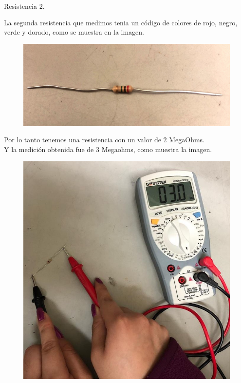 \documentclass[12pt,a4paper]{report}
\begin{document}
\begin{flushleft}
	\begin{large}
		\vspace*{2cm}
		Resistencia 2.\\
	\end{large}
	La segunda resistencia que medimos tenia un c\'odigo de colores de rojo, negro, verde y dorado, como se muestra en la imagen.\\
	
\begin{figure}[H]
	\centering
	\includegraphics[width=0.4\linewidth]{resistencia2}
	\label{fig:resistencia2}
\end{figure}
 	Por lo tanto tenemos una resistencia con un valor de 2 MegaOhms.\\
 	Y la medici\'on obtenida fue de 3 Megaohms, como muestra la imagen.\\
 	\begin{figure}[H]
 		\centering
 		\includegraphics[width=0.3\linewidth]{medicion2}
 		\label{fig:medicion2}
 	\end{figure}
 	
	
	

	 




	
\end{flushleft}
	
\end{document}
